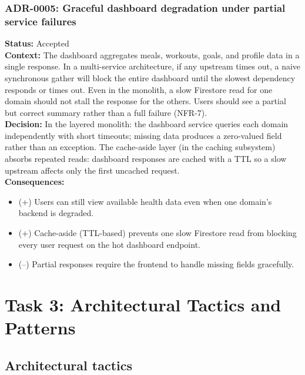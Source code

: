 \documentclass[11pt]{article}
\begin{document}
\subsubsection{ADR-0005: Graceful dashboard degradation under partial service failures}
\textbf{Status:} Accepted \\
\textbf{Context:} The dashboard aggregates meals, workouts, goals, and profile data in a single
response. In a multi-service architecture, if any upstream times out, a naive synchronous
gather will block the entire dashboard until the slowest dependency responds or times out.
Even in the monolith, a slow Firestore read for one domain should not stall the response for
the others. Users should see a partial but correct summary rather than a full failure
(NFR-7). \\
\textbf{Decision:} In the layered monolith: the dashboard service queries each domain independently
with short timeouts; missing data produces a zero-valued field rather than an exception. The
cache-aside layer (in the caching subsystem) absorbs repeated reads: dashboard responses are
cached with a TTL so a slow upstream affects only the first uncached request. \\
\textbf{Consequences:}
\begin{itemize}[leftmargin=1.2em]
  \item (+) Users can still view available health data even when one domain's backend is degraded.
  \item (+) Cache-aside (TTL-based) prevents one slow Firestore read from blocking every user
        request on the hot dashboard endpoint.
  \item (--) Partial responses require the frontend to handle missing fields gracefully.
\end{itemize}

\newpage
\section{Task 3: Architectural Tactics and Patterns}

\subsection{Architectural tactics}
\end{document}
